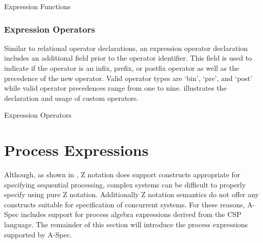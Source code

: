 \documentclass[letterpaper,10pt,draft]{book}
\begin{document}
\begin{example}
\begin{minipage}[t]{0.49\linewidth}
   
\end{minipage}
\begin{minipage}[t]{0.49\linewidth}
   \azbox
   
\end{minipage}

   \caption{Expression Functions}
   \label{ex:Function}
\end{example}

\subsubsection{Expression Operators}
   \label{sect:ExprOp}

Similar to relational operator declarations, an expression operator declaration
includes an additional field prior to the operator identifier.  This field is used
to indicate if the operator is an infix, prefix, or postfix operator as well as
the precedence of the new operator.  Valid operator types are `bin', `pre', and
`post' while valid operator precedences range from one to nine.  
illustrates the declaration and usage of custom operators.

\begin{example}
\begin{minipage}[t]{0.49\linewidth}
   
\end{minipage}
\begin{minipage}[t]{0.49\linewidth}
   \azbox
   
\end{minipage}

   \caption{Expression Operators}
   \label{ex:Operator}
\end{example}

\section{Process Expressions}
   \label{sect:CSP}

Although, as shown in , Z notation does support constructs
appropriate for specifying sequential processing, complex systems can be difficult
to properly specify using pure Z notation.  Additionally Z notation semantics do
not offer any constructs suitable for specification of concurrent systems.  For
these reasons, A-Spec includes support for process algebra expressions derived from
the CSP language.  The remainder of this section will introduce the process expressions
supported by A-Spec.
\end{document}
